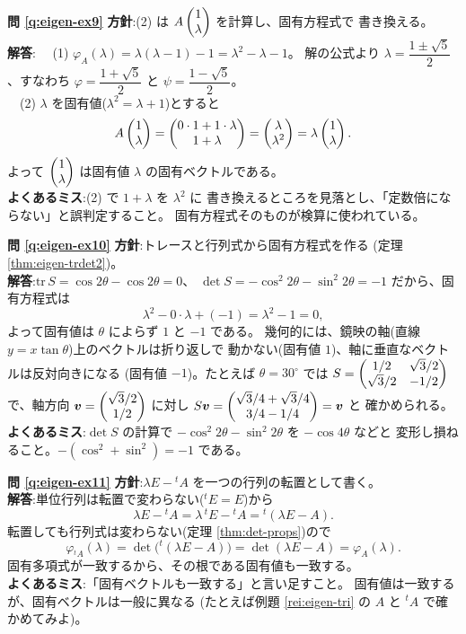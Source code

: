 \bigskip
\noindent\textbf{問 \ref{q:eigen-ex9}}\quad
\textbf{方針}:(2) は $A\begin{pmatrix}1 \\ \lambda\end{pmatrix}$ を計算し、固有方程式で
書き換える。\\
\textbf{解答}:
　(1) $\varphi_A(\lambda) = \lambda(\lambda - 1) - 1 = \lambda^2 - \lambda - 1$。
解の公式より $\lambda = \dfrac{1 \pm \sqrt{5}}{2}$、すなわち
$\varphi = \dfrac{1 + \sqrt{5}}{2}$ と $\psi = \dfrac{1 - \sqrt{5}}{2}$。\\
　(2) $\lambda$ を固有値($\lambda^2 = \lambda + 1$)とすると
\[
A\begin{pmatrix}1 \\ \lambda\end{pmatrix} = \begin{pmatrix}0 \cdot 1 + 1 \cdot \lambda \\ 1 + \lambda\end{pmatrix}
= \begin{pmatrix}\lambda \\ \lambda^2\end{pmatrix} = \lambda\begin{pmatrix}1 \\ \lambda\end{pmatrix}.
\]
よって $\begin{pmatrix}1 \\ \lambda\end{pmatrix}$ は固有値 $\lambda$ の固有ベクトルである。\\
\textbf{よくあるミス}:(2) で $1 + \lambda$ を $\lambda^2$ に
書き換えるところを見落とし、「定数倍にならない」と誤判定すること。
固有方程式そのものが検算に使われている。

\bigskip
\noindent\textbf{問 \ref{q:eigen-ex10}}\quad
\textbf{方針}:トレースと行列式から固有方程式を作る
(定理 \ref{thm:eigen-trdet2})。\\
\textbf{解答}:$\mathrm{tr}\,S = \cos 2\theta - \cos 2\theta = 0$、
$\det S = -\cos^2 2\theta - \sin^2 2\theta = -1$ だから、固有方程式は
\[
\lambda^2 - 0 \cdot \lambda + (-1) = \lambda^2 - 1 = 0,
\]
よって固有値は $\theta$ によらず $1$ と $-1$ である。
幾何的には、鏡映の軸(直線 $y = x\tan\theta$)上のベクトルは折り返しで
動かない(固有値 $1$)、軸に垂直なベクトルは反対向きになる
(固有値 $-1$)。たとえば $\theta = 30^\circ$ では
$S = \begin{pmatrix}1/2 & \sqrt{3}/2 \\ \sqrt{3}/2 & -1/2\end{pmatrix}$ で、軸方向
$\bm{v} = \begin{pmatrix}\sqrt{3}/2 \\ 1/2\end{pmatrix}$ に対し
$S\bm{v} = \begin{pmatrix}\sqrt{3}/4 + \sqrt{3}/4 \\ 3/4 - 1/4\end{pmatrix} = \bm{v}$ と
確かめられる。\\
\textbf{よくあるミス}:$\det S$ の計算で
$-\cos^2 2\theta - \sin^2 2\theta$ を $-\cos 4\theta$ などと
変形し損ねること。$-(\cos^2 + \sin^2) = -1$ である。

\bigskip
\noindent\textbf{問 \ref{q:eigen-ex11}}\quad
\textbf{方針}:$\lambda E - {}^t\!A$ を一つの行列の転置として書く。\\
\textbf{解答}:単位行列は転置で変わらない(${}^tE = E$)から
\[
\lambda E - {}^t\!A = \lambda\,{}^tE - {}^t\!A = {}^t(\lambda E - A).
\]
転置しても行列式は変わらない(定理 \ref{thm:det-props})ので
\[
\varphi_{{}^t\!A}(\lambda) = \det\bigl({}^t(\lambda E - A)\bigr)
= \det(\lambda E - A) = \varphi_A(\lambda).
\]
固有多項式が一致するから、その根である固有値も一致する。\\
\textbf{よくあるミス}:「固有ベクトルも一致する」と言い足すこと。
固有値は一致するが、固有ベクトルは一般に異なる
(たとえば例題 \ref{rei:eigen-tri} の $A$ と ${}^t\!A$ で確かめてみよ)。


